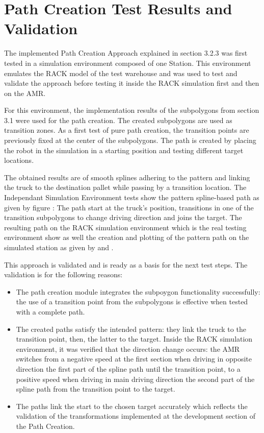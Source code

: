 \section{Path Creation Test Results and Validation}
The implemented Path Creation Approach explained in section 3.2.3 was first tested in a simulation environment
composed of one Station. This environment emulates the RACK model of the test warehouse and was used to test 
and validate the approach before testing it inside the RACK simulation first and then on the AMR.

For this environment, the implementation results of the subpolygons from section 3.1 were used for the path creation.
The created subpolygons are used as transition zones. 
As a first test of pure path creation, the transition points are previously fixed at the center of the 
subpolygons. The path is created by placing the robot in the simulation in a starting position and testing 
different target locations.

The obtained results are of smooth splines adhering to the pattern and linking the truck to the destination pallet 
while passing by a transition location. 
The Independant Simulation Environment tests show the pattern spline-based path as given by figure :
The path start at the truck's position, transitions in one of the transition subpolygons to change driving 
direction and joins the target. 
The resulting path on the RACK simulation environment which is the real testing environment show as well 
the creation and plotting of the pattern path on the simulated station as given by  and .

This approach is validated and is ready as a basis for the next test steps. 
The validation is for the following reasons:
\begin{itemize}
    \item The path creation module integrates the subpoygon functionality successfully: the use of a transition
    point from the subpolygons is effective when tested with a complete path.
    \item The created paths satisfy the intended pattern: they link the truck to the transition point, then, 
    the latter to the target. Inside the RACK simulation environment, it was verified that the direction 
    change occurs: the AMR switches from a negative speed at the first section when driving in opposite 
    direction the first part of the spline path until the transition point, to a positive speed when driving in 
    main driving direction the second part of the spline path from the transition point to the target.
    \item The paths link the start to the chosen target accurately which reflects the validation of the 
    transformations implemented at the development section of the Path Creation.
\end{itemize}

